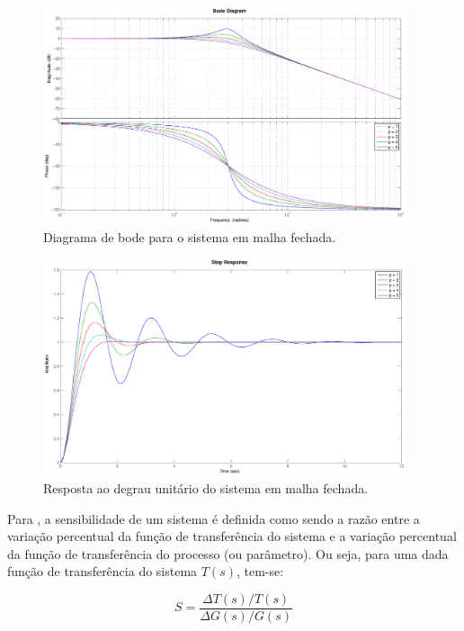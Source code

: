 \begin{figure}[htb]
\centering
    \includegraphics[width=0.95\textwidth]{imgs/questao1/bode_mf}
    \caption{Diagrama de bode para o sistema em malha fechada.}
    \label{fig:diag_bode_sensib}
\end{figure}

\begin{figure}[htb]
\centering
    \includegraphics[width=0.95\textwidth]{imgs/questao1/resp_deg_mf}
    \caption{Resposta ao degrau unitário do sistema em malha fechada.}
    \label{fig:diag_bode_sensib}
\end{figure}

Para \cite{dorf}, a sensibilidade de um sistema é definida como sendo a razão
entre a variação percentual da função de transferência do sistema e a variação
percentual da função de transferência do processo (ou parâmetro). Ou seja, para
uma dada função de transferência do sistema $T(s)$, tem-se:

\begin{equation}
S = \frac{\Delta T(s)/T(s)}{\Delta G(s)/G(s)}
\end{equation}

